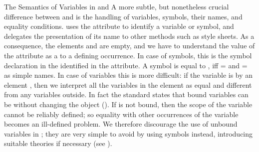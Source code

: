 \begin{omgroup}[id=mobj,short=Mathematical Objects]
\begin{module}[id=omml-semvar]
\begin{omgroup}[id=sem-var,short=Semantics of Variables]{The Semantics of Variables in
  {\openmath} and {\cmathml}}
A more subtle, but nonetheless crucial difference between {\openmath} and {\mathml} is the
handling of variables, symbols, their names, and equality conditions.  {\openmath} uses
the {} attribute to identify a variable or symbol,
and delegates the presentation of its name to other methods such as style sheets. As a
consequence, the elements {} and {} are
empty, and we have to understand the value of the {} attribute as a {} to a defining occurrence. In case of
symbols, this is the symbol declaration in the {} identified
in the {} attribute. A symbol {} is equal to {}, iff
{=} and {=} as {\xml}
simple names.  In case of variables this is more difficult: if the variable is
 by an {} element
{}, then we
interpret all the variables {} in the
{} element as equal and different from any variables
{} outside. In fact the {\openmath} standard states that bound
variables can be  without changing the object
({}). If {} is
not bound, then the scope of the variable cannot be reliably defined; so equality with
other occurrences of the variable {} becomes an ill-defined
problem.  We therefore discourage the use of unbound variables in {\omdoc}; they are very
simple to avoid by using symbols instead, introducing suitable theories if necessary (see
{}).


\end{omgroup}
\end{module}
\end{omgroup}
